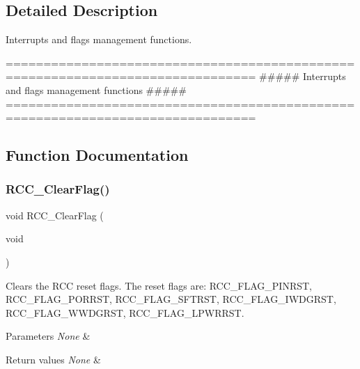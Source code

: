 \subsection{Detailed Description}
Interrupts and flags management functions. 

\begin{DoxyVerb} ===============================================================================
                ##### Interrupts and flags management functions #####
 ===============================================================================  \end{DoxyVerb}
 

\subsection{Function Documentation}
\mbox{\label{group___r_c_c___group4_ga53f909dbb15a54124419084ebda97d72}} 
\subsubsection{\texorpdfstring{R\+C\+C\+\_\+\+Clear\+Flag()}{RCC\_ClearFlag()}}
{\footnotesize\ttfamily void R\+C\+C\+\_\+\+Clear\+Flag (\begin{DoxyParamCaption}\item[{void}]{ }\end{DoxyParamCaption})}



Clears the R\+CC reset flags. The reset flags are\+: R\+C\+C\+\_\+\+F\+L\+A\+G\+\_\+\+P\+I\+N\+R\+ST, R\+C\+C\+\_\+\+F\+L\+A\+G\+\_\+\+P\+O\+R\+R\+ST, R\+C\+C\+\_\+\+F\+L\+A\+G\+\_\+\+S\+F\+T\+R\+ST, R\+C\+C\+\_\+\+F\+L\+A\+G\+\_\+\+I\+W\+D\+G\+R\+ST, R\+C\+C\+\_\+\+F\+L\+A\+G\+\_\+\+W\+W\+D\+G\+R\+ST, R\+C\+C\+\_\+\+F\+L\+A\+G\+\_\+\+L\+P\+W\+R\+R\+ST. 


\begin{DoxyParams}{Parameters}
{\em None} & \\
\hline
\end{DoxyParams}

\begin{DoxyRetVals}{Return values}
{\em None} & \\
\hline
\end{DoxyRetVals}
\mbox{\label{group___r_c_c___group4_ga529842d165910f8f87e26115da36089b}} 
